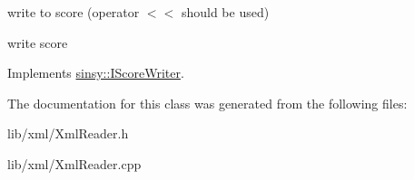 write to score (operator $<$$<$ should be used) 

write score 

\-Implements \hyperlink{classsinsy_1_1IScoreWriter_a15b81f3e78834610052da3cc48e0f7ad}{sinsy\-::\-I\-Score\-Writer}.



\-The documentation for this class was generated from the following files\-:\begin{DoxyCompactItemize}
\item 
lib/xml/\-Xml\-Reader.\-h\item 
lib/xml/\-Xml\-Reader.\-cpp\end{DoxyCompactItemize}
